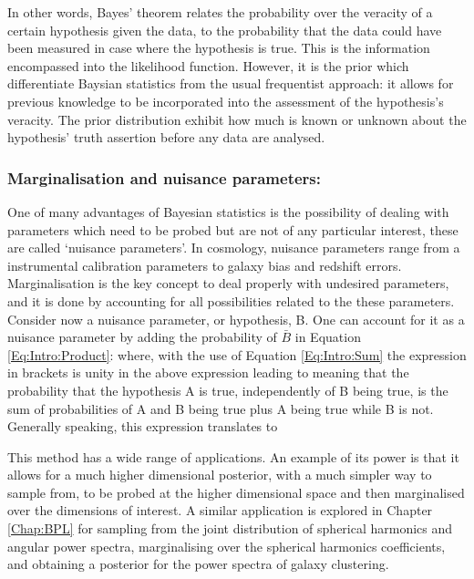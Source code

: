 \qquad In other words, Bayes' theorem relates the probability over the veracity of a certain hypothesis given the data, to the probability that the data could have been measured in case where the hypothesis is true. This is the information encompassed into the likelihood function. However, it is the prior which differentiate Baysian statistics from the usual frequentist approach: it allows for previous knowledge to be incorporated into the assessment of the hypothesis's veracity. The prior distribution exhibit how much is known or unknown about the hypothesis' truth assertion before any data are analysed. 

\subsubsection{Marginalisation and nuisance parameters:}
One of many advantages of Bayesian statistics is the possibility of dealing with parameters which need to be probed but are not of any particular interest, these are called `nuisance parameters'. In cosmology, nuisance parameters range from a instrumental calibration parameters to galaxy bias and redshift errors. Marginalisation is the key concept to deal properly with undesired parameters, and it is done by accounting for all possibilities related to the these parameters. Consider now a nuisance parameter, or hypothesis, B. One can account for it as a nuisance parameter by adding the probability of $\bar{B}$ in Equation \eqref{Eq:Intro:Product}:
where, with the use of Equation \eqref{Eq:Intro:Sum} the expression in brackets is unity in the above expression leading to
meaning that the probability that the hypothesis A is true, independently of B being true, is the sum of probabilities of A and B being true plus A being true while B is not. Generally speaking, this expression translates to

\qquad This method has a wide range of applications. An example of its power is that it allows for a much higher dimensional posterior, with a much simpler way to sample from, to be probed at the higher dimensional space and then marginalised over the dimensions of interest. A similar application is explored in Chapter \ref{Chap:BPL} for sampling from the joint distribution of spherical harmonics and angular power spectra, marginalising over the spherical harmonics coefficients, and obtaining a posterior for the power spectra of galaxy clustering.

